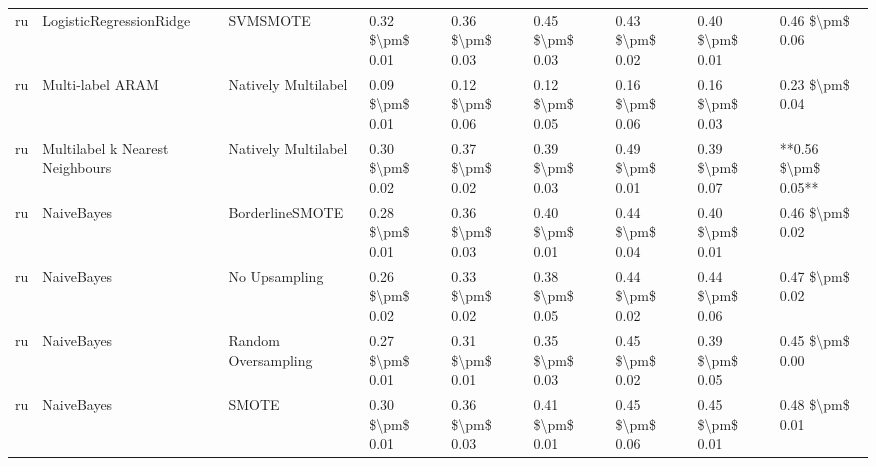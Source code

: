 \begin{tabular}{lllllllll}
      ru &         LogisticRegressionRidge &                      SVMSMOTE & 0.32 \$\textbackslash pm\$ 0.01 &           0.36 \$\textbackslash pm\$ 0.03 &       0.45 \$\textbackslash pm\$ 0.03 &        0.43 \$\textbackslash pm\$ 0.02 &                         0.40 \$\textbackslash pm\$ 0.01 &     0.46 \$\textbackslash pm\$ 0.06 \\
      ru &                Multi-label ARAM &           Natively Multilabel & 0.09 \$\textbackslash pm\$ 0.01 &           0.12 \$\textbackslash pm\$ 0.06 &       0.12 \$\textbackslash pm\$ 0.05 &        0.16 \$\textbackslash pm\$ 0.06 &                         0.16 \$\textbackslash pm\$ 0.03 &     0.23 \$\textbackslash pm\$ 0.04 \\
      ru & Multilabel k Nearest Neighbours &           Natively Multilabel & 0.30 \$\textbackslash pm\$ 0.02 &           0.37 \$\textbackslash pm\$ 0.02 &       0.39 \$\textbackslash pm\$ 0.03 &        0.49 \$\textbackslash pm\$ 0.01 &                         0.39 \$\textbackslash pm\$ 0.07 & **0.56 \$\textbackslash pm\$ 0.05** \\
      ru &                      NaiveBayes &               BorderlineSMOTE & 0.28 \$\textbackslash pm\$ 0.01 &           0.36 \$\textbackslash pm\$ 0.03 &       0.40 \$\textbackslash pm\$ 0.01 &        0.44 \$\textbackslash pm\$ 0.04 &                         0.40 \$\textbackslash pm\$ 0.01 &     0.46 \$\textbackslash pm\$ 0.02 \\
      ru &                      NaiveBayes &                 No Upsampling & 0.26 \$\textbackslash pm\$ 0.02 &           0.33 \$\textbackslash pm\$ 0.02 &       0.38 \$\textbackslash pm\$ 0.05 &        0.44 \$\textbackslash pm\$ 0.02 &                         0.44 \$\textbackslash pm\$ 0.06 &     0.47 \$\textbackslash pm\$ 0.02 \\
      ru &                      NaiveBayes &           Random Oversampling & 0.27 \$\textbackslash pm\$ 0.01 &           0.31 \$\textbackslash pm\$ 0.01 &       0.35 \$\textbackslash pm\$ 0.03 &        0.45 \$\textbackslash pm\$ 0.02 &                         0.39 \$\textbackslash pm\$ 0.05 &     0.45 \$\textbackslash pm\$ 0.00 \\
      ru &                      NaiveBayes &                         SMOTE & 0.30 \$\textbackslash pm\$ 0.01 &           0.36 \$\textbackslash pm\$ 0.03 &       0.41 \$\textbackslash pm\$ 0.01 &        0.45 \$\textbackslash pm\$ 0.06 &                         0.45 \$\textbackslash pm\$ 0.01 &     0.48 \$\textbackslash pm\$ 0.01 \\

\end{tabular}
